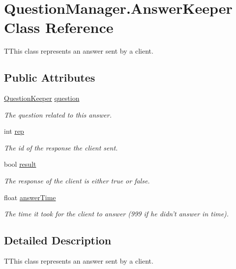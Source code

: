 \hypertarget{class_question_manager_1_1_answer_keeper}{\section{Question\-Manager.\-Answer\-Keeper Class Reference}
\label{class_question_manager_1_1_answer_keeper}
}


T\-This class represents an answer sent by a client. 


\subsection*{Public Attributes}
\begin{DoxyCompactItemize}
\item 
\hyperlink{class_question_manager_1_1_question_keeper}{Question\-Keeper} \hyperlink{class_question_manager_1_1_answer_keeper_a5f78a95b6ab1f7f094d857924eea9aa1}{question}
\begin{DoxyCompactList}\small\item\em The question related to this answer.\end{DoxyCompactList}\item 
int \hyperlink{class_question_manager_1_1_answer_keeper_ad0ed5f3d9c55dd4269825d9a25b9f163}{rep}
\begin{DoxyCompactList}\small\item\em The id of the response the client sent.\end{DoxyCompactList}\item 
bool \hyperlink{class_question_manager_1_1_answer_keeper_ab0b449e6db655f4acaa3141f85867587}{result}
\begin{DoxyCompactList}\small\item\em The response of the client is either true or false.\end{DoxyCompactList}\item 
float \hyperlink{class_question_manager_1_1_answer_keeper_acf690b9c1dbdd09140826d8433e220e8}{answer\-Time}
\begin{DoxyCompactList}\small\item\em The time it took for the client to answer (999 if he didn't answer in time).\end{DoxyCompactList}\end{DoxyCompactItemize}


\subsection{Detailed Description}
T\-This class represents an answer sent by a client.



